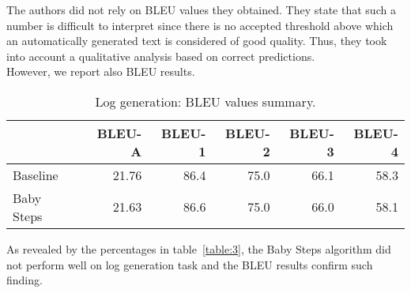The authors did not rely on BLEU values they obtained. They state that such a number is difficult to 
interpret since there is no accepted threshold above which an automatically generated text is considered of 
good quality. Thus, they took into account a qualitative analysis based on correct predictions.\\
However, we report also BLEU results.
\begin{table}[h!]
    \centering
    \begin{tabular}{l|r|r|r|r|r}
     & BLEU-A & BLEU-1 & BLEU-2 & BLEU-3 & BLEU-4\\ [0.5ex] 
     \hline
     Baseline & 21.76 & 86.4 & 75.0 & 66.1 & 58.3\\  
     Baby Steps & 21.63 & 86.6 & 75.0 & 66.0 & 58.1\\ [1ex]
     \end{tabular}
    \caption{Log generation: BLEU values summary.}
    \label{table:4}
\end{table}
As revealed by the percentages in table~\ref{table:3}, the Baby Steps algorithm did not perform well
on log generation task and the BLEU results confirm such finding.